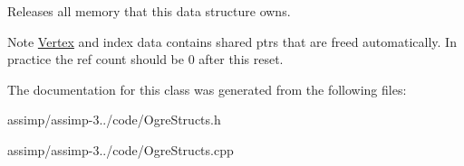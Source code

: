 Releases all memory that this data structure owns. 

\begin{DoxyNote}{Note}
\hyperlink{class_assimp_1_1_vertex}{Vertex} and index data contains shared ptrs that are freed automatically. In practice the ref count should be 0 after this reset. 
\end{DoxyNote}


The documentation for this class was generated from the following files\+:\begin{DoxyCompactItemize}
\item 
assimp/assimp-\/3../code/Ogre\+Structs.\+h\item 
assimp/assimp-\/3../code/Ogre\+Structs.\+cpp\end{DoxyCompactItemize}
